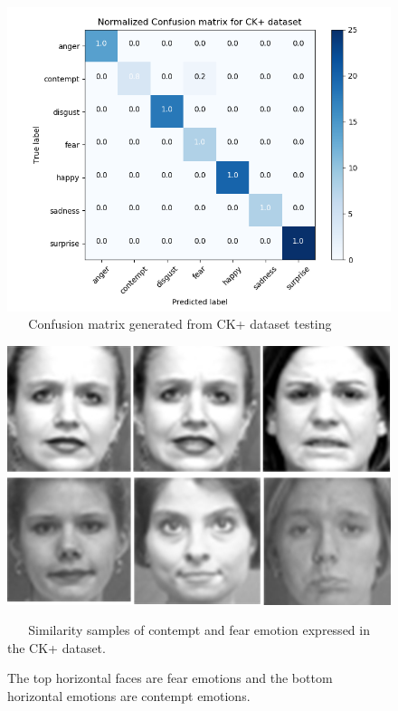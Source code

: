 \documentclass[master]{thesis-uestc}
\begin{document}
\begin{figure}[ht]
\includegraphics[width=5in]{pic/ck+_cm.png}
\caption{\,\,\,\,\,\,\,\,\,\,Confusion matrix generated from CK+ dataset testing}
\label{ck+_cm}
\end{figure}

\begin{figure}[ht]
\includegraphics[width=5in]{pic/ck+similarity.jpg}
\caption{\,\,\,\,\,\,\,\,\,\,Similarity samples of contempt and fear emotion expressed in the CK+ dataset.}
\caption*{The top horizontal faces are fear emotions and the bottom horizontal emotions are contempt emotions.}
\label{ck+_similarity}
\end{figure}
\end{document}
